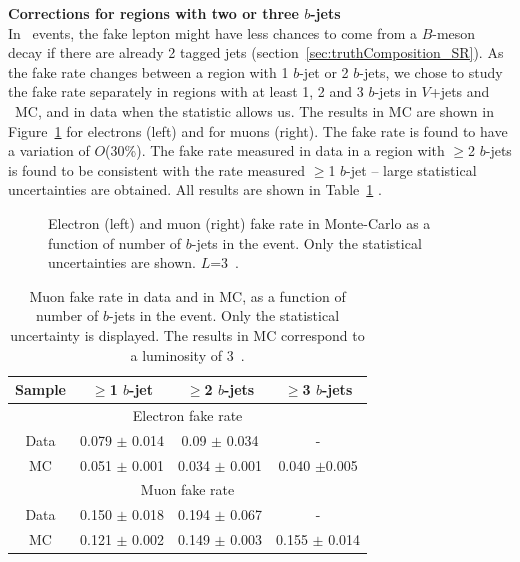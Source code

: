 \par{\bf Corrections for regions with two or three $b$-jets\\}
In \ttbar\ events, the fake lepton might have less chances to come from a $B$-meson decay if there are already 2 tagged jets (section~\ref{sec:truthComposition_SR}). 
As the fake rate changes between a region with 1 $b$-jet or 2 $b$-jets, 
we chose to study the fake rate separately in regions with at least 1, 2 and 3 $b$-jets in $V$+jets and \ttbar\ MC, 
and in data when the statistic allows us. 
The results in MC are shown in Figure~\ref{Fig:Fake_Rate_nbJets} for electrons (left) and for muons (right). 
The fake rate is found to have a variation of $O$(30\%). 
The fake rate measured in data in a region with $\geq$2 $b$-jets is found to be consistent with the rate measured $\geq$1 $b$-jet 
-- large statistical uncertainties are obtained. 
All results are shown in Table~\ref{table:fake_muon_nrbjets_Data_MC} . 
  
\begin{figure}[h!]
\centering
{}   
\vspace{-0.2cm}
\caption{Electron (left) and muon (right) fake rate in Monte-Carlo as a function of number of $b$-jets in the event. 
Only the statistical uncertainties are shown. $L$=3~\ifb.}
\label{Fig:Fake_Rate_nbJets}  
\end{figure}
%
\begin{table}
\centering
\begin{tabular}{|c|c|c|c|} \hline
Sample & $\geq$1 $b$-jet & $\geq$2 $b$-jets & $\geq$3 $b$-jets \\\hline\hline  
\multicolumn{4}{|c|}{Electron fake rate} \\ \hline
Data & 0.079 $\pm$ 0.014 & 0.09 $\pm$ 0.034 & -\\ 
MC   &0.051 $\pm$ 0.001 & 0.034 $\pm$ 0.001 & 0.040 $\pm$0.005\\\hline  \hline
\multicolumn{4}{|c|}{Muon fake rate} \\ \hline
Data &0.150 $\pm$ 0.018 & 0.194 $\pm$ 0.067 & -\\ 
MC   &0.121 $\pm$ 0.002 & 0.149 $\pm$ 0.003 &0.155 $\pm$ 0.014 \\\hline 
\end{tabular}  
\caption{Muon fake rate in data and in MC, as a function of number of $b$-jets in the event. 
Only the statistical uncertainty is displayed. The results in MC correspond to a luminosity of 3~\ifb.}
\label{table:fake_muon_nrbjets_Data_MC}
\end{table}



